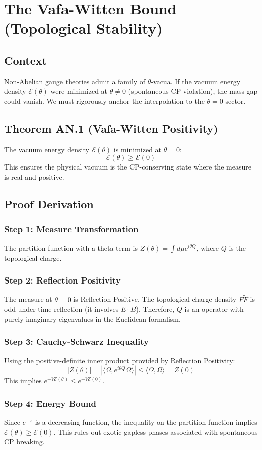 \chapter{The Vafa-Witten Bound (Topological Stability)}
\label{ch:derivation_an_vafa_witten}

\section{Context}
Non-Abelian gauge theories admit a family of $\theta$-vacua. If the vacuum energy density $\mathcal{E}(\theta)$ were minimized at $\theta \ne 0$ (spontaneous CP violation), the mass gap could vanish. We must rigorously anchor the interpolation to the $\theta=0$ sector.

\section{Theorem AN.1 (Vafa-Witten Positivity)}
The vacuum energy density $\mathcal{E}(\theta)$ is minimized at $\theta=0$:
\begin{equation}
\mathcal{E}(\theta) \ge \mathcal{E}(0)
\end{equation}
This ensures the physical vacuum is the CP-conserving state where the measure is real and positive.

\section{Proof Derivation}

\subsection{Step 1: Measure Transformation}
The partition function with a theta term is $Z(\theta) = \int d\mu e^{i\theta Q}$, where $Q$ is the topological charge.

\subsection{Step 2: Reflection Positivity}
The measure at $\theta=0$ is Reflection Positive. The topological charge density $F \tilde{F}$ is odd under time reflection (it involves $E \cdot B$). Therefore, $Q$ is an operator with purely imaginary eigenvalues in the Euclidean formalism.

\subsection{Step 3: Cauchy-Schwarz Inequality}
Using the positive-definite inner product provided by Reflection Positivity:
\begin{equation}
|Z(\theta)| = |\langle \Omega, e^{i\theta Q} \Omega \rangle| \le \langle \Omega, \Omega \rangle = Z(0)
\end{equation}
This implies $e^{-V \mathcal{E}(\theta)} \le e^{-V \mathcal{E}(0)}$.

\subsection{Step 4: Energy Bound}
Since $e^{-x}$ is a decreasing function, the inequality on the partition function implies $\mathcal{E}(\theta) \ge \mathcal{E}(0)$. This rules out exotic gapless phases associated with spontaneous CP breaking.
